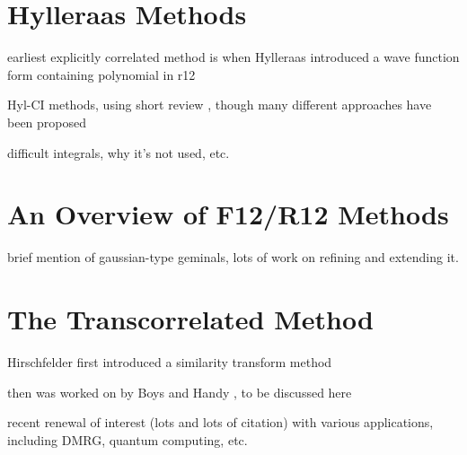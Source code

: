 \section{Hylleraas Methods}

earliest explicitly correlated method is when Hylleraas introduced a wave function form containing polynomial in r12\cite{hylleraasNeueBerechnungEnergie1929}
\cite{slaterCentralFieldsRydberg1928}


Hyl-CI methods, using short review \cite{largo-cabrerizoHylleraasCI1987}, though many different approaches have been proposed
\cite{jamesGround1933,kolosAccurate1964,perkinsAtomic1968,perkinsAtomic1969,simsCombined1971,simsOneCenter1971,claryHylleraastype1977,claryCIHylleraas1976}

difficult integrals, why it's not used, etc.


\section{An Overview of F12/R12 Methods}

brief mention of gaussian-type geminals\cite{boysIntegral1960,singerUse1960}, lots of work on refining and extending it.\cite{lesterGaussian1964,mitroyTheory2013,bukowskiNew1994,perssonAccurate1996,panGaussian1970,panElectron1972,szalewiczNew1982,szalewiczAtomic1983,wenzelAtomic1986}


\section{The Transcorrelated Method}
\label{sec:tc}

Hirschfelder first introduced a similarity transform method \cite{hirschfelderRemoval1963}

then was worked on by Boys and Handy , to be discussed here

recent renewal of interest (lots and lots of citation) with various applications, including DMRG, quantum computing, etc.

